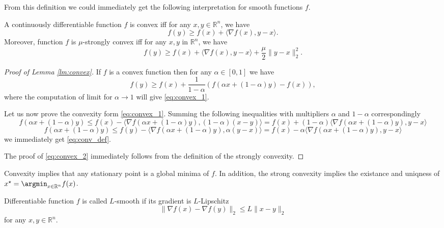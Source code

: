 From this definition we could immediately get the following interpretation for smooth functions $f$.

\begin{lemma}\label{lm:convex}
    A continuously differentiable function $f$ is convex iff for any $x,y\in\mathbb{R}^n$, we have
    \begin{equation}\label{eq:convex_1}
        f(y) \geq f(x) + \langle \nabla f(x), y-x\rangle.
    \end{equation}
    Moreover, function $f$ is $\mu$-strongly convex iff for any $x,y$ in $\mathbb{R}^n$, we have
    \begin{equation}\label{eq:convex_2}
        f(y) \geq f(x) + \langle \nabla f(x), y-x\rangle + \frac{\mu}{2}\|y-x\|_2^2.
    \end{equation}
\end{lemma}
\begin{proof}[Proof of Lemma \ref{lm:convex}]
If $f$ is a convex function then for any $\alpha\in[0,1]$ we have 
$$
f(y)\geq f(x) +\frac{1}{1-\alpha}\left(f(\alpha x + (1-\alpha)y) - f(x)\right),
$$
where the computation of limit for $\alpha \rightarrow 1$ will give \eqref{eq:convex_1}.

Let us now prove the convexity form \eqref{eq:convex_1}.
Summing the following inequalities with multipliers $\alpha$ and $1-\alpha$ correspondingly
$$
f(\alpha x + (1-\alpha)y) \leq f(x) - \langle \nabla f(\alpha x + (1-\alpha)y), (1-\alpha)(x-y)\rangle = f(x) + (1-\alpha) \langle \nabla f(\alpha x + (1-\alpha)y), y-x\rangle
$$
$$
f(\alpha x + (1-\alpha)y) \leq f(y) - \langle \nabla f(\alpha x + (1-\alpha)y), \alpha(y-x)\rangle = f(x) - \alpha \langle \nabla f(\alpha x + (1-\alpha)y), y-x\rangle
$$
we immediately get \eqref{eq:conv_def}. 

The proof of \eqref{eq:convex_2} immediately follows from the definition of the strongly convexity.


\end{proof}

Convexity implies that any stationary point is a global minima of $f$. In addition, the strong convexity implies the existance and uniqness of $x^\star = \argmin_{x\in\mathbb{R}^n} f(x)$.

\begin{definition}[$L$-smoothness]
Differentiable function $f$ is called $L$-smooth if its gradient is $L$-Lipschitz
\begin{equation}
    \|\nabla f(x) - \nabla f(y)\|_2\leq L\|x-y\|_2
\end{equation}
for any $x,y\in\mathbb{R}^n$.
\end{definition}

